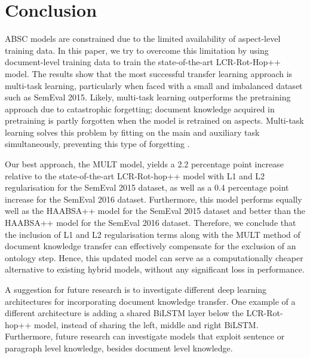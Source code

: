 \section{Conclusion}
ABSC models are constrained due to the limited availability of aspect-level training data. In this paper, we try to overcome this limitation by using document-level training data to train the state-of-the-art LCR-Rot-Hop++ model. The results show that the most successful transfer learning approach is multi-task learning, particularly when faced with a small and imbalanced dataset such as SemEval 2015. Likely, multi-task learning outperforms the pretraining approach due to catastrophic forgetting; document knowledge acquired in pretraining is partly forgotten when the model is retrained on aspects. Multi-task learning solves this problem by fitting on the main and auxiliary task simultaneously, preventing this type of forgetting \cite{Chen2020}. 

Our best approach, the MULT model, yields a 2.2 percentage point increase relative to the state-of-the-art LCR-Rot-hop++ model with L1 and L2 regularisation for the SemEval 2015 dataset, as well as a 0.4 percentage point increase for the SemEval 2016 dataset. Furthermore, this model performs equally well as the HAABSA++ model for the SemEval 2015 dataset and better than the HAABSA++ model for the SemEval 2016 dataset. Therefore, we conclude that the inclusion of L1 and L2 regularisation terms along with the MULT method of document knowledge transfer can effectively compensate for the exclusion of an ontology step. Hence, this updated model can serve as a computationally cheaper alternative to existing hybrid models, without any significant loss in performance.

A suggestion for future research is to investigate different deep learning architectures for incorporating document knowledge transfer. One example of a different architecture is adding a shared BiLSTM layer below the LCR-Rot-hop++ model, instead of sharing the left, middle and right BiLSTM. Furthermore, future research can investigate models that exploit sentence or paragraph level knowledge, besides document level knowledge.  